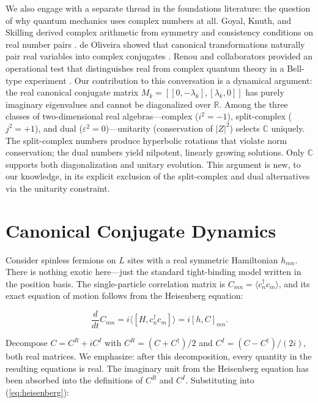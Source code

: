 \documentclass[aps,prd,reprint,superscriptaddress,twocolumn]{revtex4-2}
\begin{document}
We also engage with a separate thread in the foundations literature: the question of why quantum mechanics uses complex numbers at all. Goyal, Knuth, and Skilling derived complex arithmetic from symmetry and consistency conditions on real number pairs \cite{Goyal2009}. de Oliveira showed that canonical transformations naturally pair real variables into complex conjugates \cite{deOliveira2023}. Renou and collaborators provided an operational test that distinguishes real from complex quantum theory in a Bell-type experiment \cite{Renou2021}. Our contribution to this conversation is a dynamical argument: the real canonical conjugate matrix $M_k = [[0,-\lambda_k],[\lambda_k,0]]$ has purely imaginary eigenvalues and cannot be diagonalized over $\mathbb{R}$. Among the three classes of two-dimensional real algebras---complex ($i^2=-1$), split-complex ($j^2=+1$), and dual ($\varepsilon^2=0$)---unitarity (conservation of $|Z|^2$) selects $\mathbb{C}$ uniquely. The split-complex numbers produce hyperbolic rotations that violate norm conservation; the dual numbers yield nilpotent, linearly growing solutions. Only $\mathbb{C}$ supports both diagonalization and unitary evolution. This argument is new, to our knowledge, in its explicit exclusion of the split-complex and dual alternatives via the unitarity constraint.

\section{Canonical Conjugate Dynamics}

Consider spinless fermions on $L$ sites with a real symmetric Hamiltonian $h_{mn}$. There is nothing exotic here---just the standard tight-binding model written in the position basis. The single-particle correlation matrix is $C_{mn} = \langle c^\dagger_n c_m\rangle$, and its exact equation of motion follows from the Heisenberg equation:

\begin{equation}
\frac{d}{dt}C_{mn} = i\langle[H, c^\dagger_n c_m]\rangle = i[h, C]_{mn}.
\label{eq:heisenberg}
\end{equation}

Decompose $C = C^R + iC^I$ with $C^R = (C+C^\dagger)/2$ and $C^I = (C-C^\dagger)/(2i)$, both real matrices. We emphasize: after this decomposition, every quantity in the resulting equations is real. The imaginary unit from the Heisenberg equation has been absorbed into the definitions of $C^R$ and $C^I$. Substituting into (\ref{eq:heisenberg}):
\end{document}
